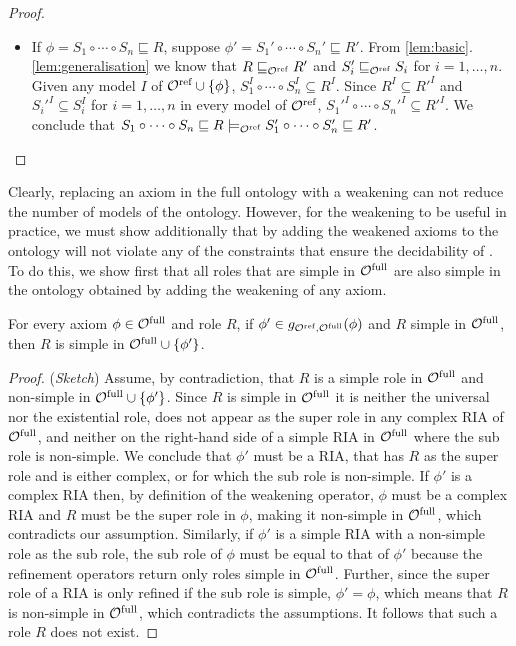 \documentclass[
]{ceurart}
\begin{document}
\begin{proof}
\begin{itemize}
    \item If $\phi = S_1 \circ \cdots \circ S_n \sqsubseteq R$, suppose $\phi' = S_1' \circ \cdots \circ S_n' \sqsubseteq R'$. From \cref{lem:basic}.\ref{lem:generalisation} we know that $R \sqsubseteq_{\mathcal{O}^\textnormal{ref}} R'$ and $S_i' \sqsubseteq_{\mathcal{O}^\textnormal{ref}} S_i$ for $i = 1, \dots, n$. Given any model $I$ of ${\mathcal{O}^\textnormal{ref}} \cup \{ \phi \}$, $S_1^I \circ \cdots \circ S_n^I \subseteq R^I$. Since $R^I \subseteq R'^I$ and $S_i'^I \subseteq S_i^I$ for $i = 1, \dots, n$ in every model of ${\mathcal{O}^\textnormal{ref}}$, $S_1'^I \circ \cdots \circ S_n'^I \subseteq R'^I$. We conclude that $S_1 \circ \cdots \circ S_n \sqsubseteq R \models_{\mathcal{O}^\textnormal{ref}} S_1' \circ \cdots \circ S_n' \sqsubseteq R'$.
  \end{itemize}
\end{proof}

Clearly, replacing an axiom in the full ontology with a weakening can not reduce the number of  models of the ontology. However, for the weakening to be useful in practice, we must show additionally that by adding the weakened axioms to the ontology will not violate any of the constraints that ensure the decidability of \SROIQ. To do this, we show first that all roles that are simple in ${\mathcal{O}^\textnormal{full}}$ are also simple in the ontology obtained by adding the weakening of any axiom.

\begin{lemma} \label{lem:simple-roles}
  For every axiom $\phi \in {\mathcal{O}^\textnormal{full}}$ and role $R$, if $\phi' \in g_{{\mathcal{O}^\textnormal{ref}},{\mathcal{O}^\textnormal{full}}}(\phi)$ and $R$ simple in ${\mathcal{O}^\textnormal{full}}$, then $R$ is simple in ${\mathcal{O}^\textnormal{full}} \cup \{ \phi' \}$.
\end{lemma}

\begin{proof}(\emph{Sketch})
  Assume, by contradiction, that $R$ is a simple role in ${\mathcal{O}^\textnormal{full}}$ and non-simple in ${\mathcal{O}^\textnormal{full}} \cup \{ \phi' \}$. Since $R$ is simple in ${\mathcal{O}^\textnormal{full}}$ it is neither the universal nor the existential role, does not appear as the super role in any complex RIA of ${\mathcal{O}^\textnormal{full}}$, and neither on the right-hand side of a simple RIA in ${\mathcal{O}^\textnormal{full}}$ where the sub role is non-simple. We conclude that $\phi'$ must be a RIA, that has $R$ as the super role and is either complex, or for which the sub role is non-simple. If $\phi'$ is a complex RIA then, by definition of the weakening operator, $\phi$ must be a complex RIA and $R$ must be the super role in $\phi$, making it non-simple in ${\mathcal{O}^\textnormal{full}}$, which contradicts our assumption. Similarly, if $\phi'$ is a simple RIA with a non-simple role as the sub role, the sub role of $\phi$ must be equal to that of $\phi'$ because the refinement operators return only roles simple in ${\mathcal{O}^\textnormal{full}}$. Further, since the super role of a RIA is only refined if the sub role is simple, $\phi' = \phi$, which means that $R$ is non-simple in ${\mathcal{O}^\textnormal{full}}$, which contradicts the assumptions. It follows that such a role $R$ does not exist.
\end{proof}
\end{document}
